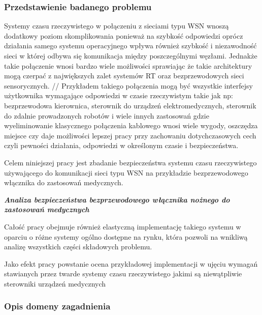 \subsubsection{Przedstawienie badanego problemu}

\par 
\tab
Systemy czasu rzeczywistego w połączeniu z sieciami typu WSN wnoszą dodatkowy poziom skomplikowania ponieważ na szybkość odpowiedzi oprócz działania samego systemu operacyjnego wpływa również szybkość i niezawodność sieci w której odbywa się komunikacja między poszczególnymi węzłami. Jednakże takie połączenie wnosi bardzo wiele możliwości sprawiając że takie architektury mogą czerpać z największych zalet systemów RT oraz bezprzewodowych sieci sensorycznych. //
Przykładem takiego połączenia mogą być wszystkie interfejsy użytkownika wymagające odpowiedzi w czasie rzeczywistym takie jak np: bezprzewodowa kierownica, sterownik do urządzeń elektromedycznych, sterownik do zdalnie prowadzonych robotów i wiele innych zastosowań gdzie wyeliminowanie klasycznego połączenia kablowego wnosi wiele wygody, oszczędza miejsce czy daje możliwości lepszej pracy przy zachowaniu dotychczasowych cech czyli pewności działania, odpowiedzi w określonym czasie i bezpieczeństwa.

Celem niniejszej pracy jest zbadanie bezpieczeństwa systemu czasu rzeczywistego używającego do komunikacji sieci typu WSN na przykładzie bezprzewodowego włącznika do zastosowań medycznych. \\

\begin{master_thesis}
\textbf{ \textit{Analiza bezpieczeństwa bezprzewodowego włącznika nożnego do zastosowań  medycznych} }
\end{master_thesis}

Całość pracy obejmuje również elastyczną implementację takiego systemu w oparciu o różne systemy ogólno dostępne na rynku, która pozwoli na wnikliwą analizę wszystkich części składowych problemu.

Jako efekt pracy powstanie ocena przykładowej implementacji w ujęciu wymagań stawianych przez twarde systemy czasu rzeczywistego jakimi są niewątpliwie sterowniki urządzeń medycznych


\subsubsection{Opis domeny zagadnienia}

